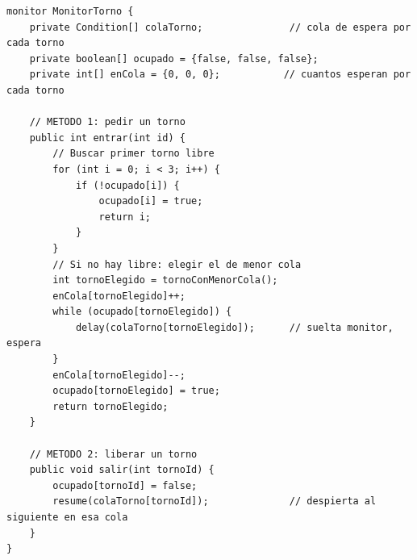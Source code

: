 \documentclass[12pt,a4paper]{article}
\begin{document}
\newpage
\begin{lstlisting}[language={}, caption={Pseudocódigo MonitorTorno}]
monitor MonitorTorno {
    private Condition[] colaTorno;               // cola de espera por cada torno
    private boolean[] ocupado = {false, false, false};
    private int[] enCola = {0, 0, 0};           // cuantos esperan por cada torno

    // METODO 1: pedir un torno
    public int entrar(int id) {
        // Buscar primer torno libre
        for (int i = 0; i < 3; i++) {
            if (!ocupado[i]) {
                ocupado[i] = true;
                return i;
            }
        }
        // Si no hay libre: elegir el de menor cola
        int tornoElegido = tornoConMenorCola();
        enCola[tornoElegido]++;
        while (ocupado[tornoElegido]) {
            delay(colaTorno[tornoElegido]);      // suelta monitor, espera
        }
        enCola[tornoElegido]--;
        ocupado[tornoElegido] = true;
        return tornoElegido;
    }

    // METODO 2: liberar un torno
    public void salir(int tornoId) {
        ocupado[tornoId] = false;
        resume(colaTorno[tornoId]);              // despierta al siguiente en esa cola
    }
}
\end{lstlisting}
\end{document}
